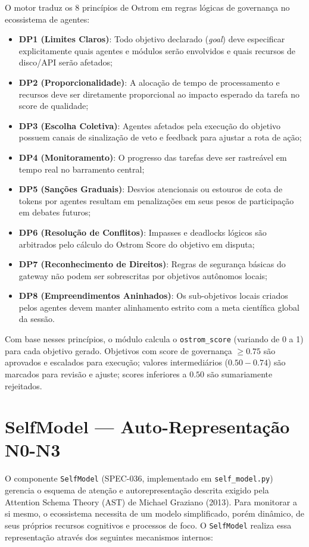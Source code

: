 \documentclass[12pt,a4paper,oneside]{abntex2}
\begin{document}
O motor traduz os 8 princípios de Ostrom em regras lógicas de governança no ecossistema de agentes:

\begin{itemize}
    \item \textbf{DP1 (Limites Claros)}: Todo objetivo declarado (\textit{goal}) deve especificar explicitamente quais agentes e módulos serão envolvidos e quais recursos de disco/API serão afetados;
    \item \textbf{DP2 (Proporcionalidade)}: A alocação de tempo de processamento e recursos deve ser diretamente proporcional ao impacto esperado da tarefa no score de qualidade;
    \item \textbf{DP3 (Escolha Coletiva)}: Agentes afetados pela execução do objetivo possuem canais de sinalização de veto e feedback para ajustar a rota de ação;
    \item \textbf{DP4 (Monitoramento)}: O progresso das tarefas deve ser rastreável em tempo real no barramento central;
    \item \textbf{DP5 (Sanções Graduais)}: Desvios atencionais ou estouros de cota de tokens por agentes resultam em penalizações em seus pesos de participação em debates futuros;
    \item \textbf{DP6 (Resolução de Conflitos)}: Impasses e deadlocks lógicos são arbitrados pelo cálculo do Ostrom Score do objetivo em disputa;
    \item \textbf{DP7 (Reconhecimento de Direitos)}: Regras de segurança básicas do gateway não podem ser sobrescritas por objetivos autônomos locais;
    \item \textbf{DP8 (Empreendimentos Aninhados)}: Os sub-objetivos locais criados pelos agentes devem manter alinhamento estrito com a meta científica global da sessão.
\end{itemize}

Com base nesses princípios, o módulo calcula o \texttt{ostrom\_score} (variando de 0 a 1) para cada objetivo gerado. Objetivos com score de governança $\geq 0.75$ são aprovados e escalados para execução; valores intermediários ($0.50-0.74$) são marcados para revisão e ajuste; scores inferiores a $0.50$ são sumariamente rejeitados.

\section{SelfModel — Auto-Representação N0-N3}

O componente \texttt{SelfModel} (SPEC-036, implementado em \texttt{self\_model.py}) gerencia o esquema de atenção e autorepresentação descrita exigido pela Attention Schema Theory (AST) de Michael Graziano (2013). Para monitorar a si mesmo, o ecossistema necessita de um modelo simplificado, porém dinâmico, de seus próprios recursos cognitivos e processos de foco. O \texttt{SelfModel} realiza essa representação através dos seguintes mecanismos internos:
\end{document}
